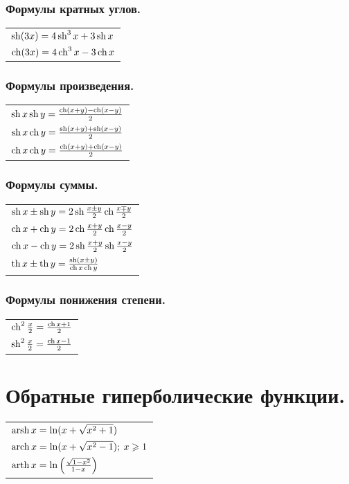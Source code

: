 \subsubsection{Формулы кратных углов.}
\begin{tabular}{l}
$\sh (3x) = 4\sh^3 x + 3 \sh x$
\\
$\ch (3x) = 4 \ch^3 x - 3 \ch x$
\end{tabular}
\subsubsection{Формулы произведения.}
\begin{tabular}{l}
$\sh x \sh y = \frac{\ch(x + y) - \ch (x - y)}{2}$
\\
$\sh x \ch y = \frac{\sh(x + y) + \sh(x - y)}{2}$
\\
$\ch x \ch y = \frac{\ch(x + y) + \ch(x - y)}{2}$
\end{tabular}
\subsubsection{Формулы суммы.}
\begin{tabular}{l}
$\sh x \pm \sh y = 2 \sh\frac{x \pm y}{2} \ch\frac{x \mp y}{2}$
\\
$\ch x + \ch y = 2 \ch\frac{x + y}{2}\ch\frac{x - y}{2}$
\\
$\ch x - \ch y = 2 \sh\frac{x + y}{2}\sh\frac{x - y}{2}$
\\
$\th x \pm \th y = \frac{\sh(x \pm y)}{\ch x \ch y}$
\end{tabular}
\subsubsection{Формулы понижения степени.}
\begin{tabular}{l}
$\ch^2 \frac{x}{2} = \frac{\ch x + 1}{2}$
\\
$\sh^2 \frac{x}{2} = \frac{\ch x - 1}{2}$
\end{tabular}
\section{Обратные гиперболические функции.}
\begin{tabular}{l}
$\arsh x = \ln(x + \sqrt{x^2 + 1})$
\\
$\arch x = \ln(x + \sqrt{x^2 - 1}); \: x \ge 1$
\\
$\arth x = \ln \left(\frac{\sqrt{1 - x^2}}{1 - x} \right)$
\\
\end{tabular}
\newpage

